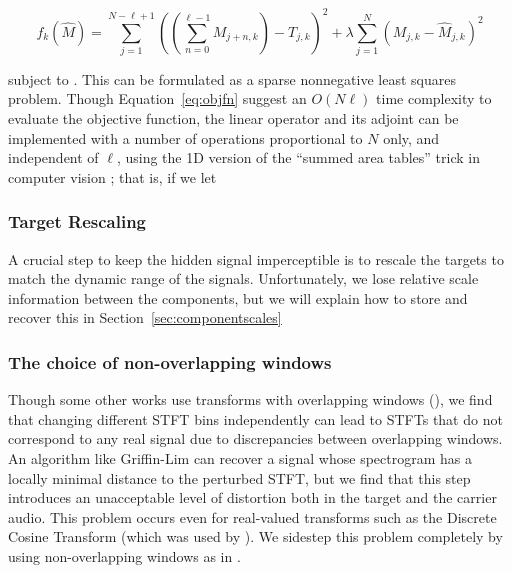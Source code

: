 \documentclass[runningheads]{llncs}
\begin{document}
\begin{equation}
  \label{eq:objfn}
  f_k(\hat{M}) = \sum_{j=1}^{N-\ell+1} \left( \left( \sum_{n = 0}^{\ell-1} M_{j+n, k} \right) - T_{j, k} \right)^2 + \lambda \sum_{j=1}^N \left( M_{j, k} - \hat{M}_{j, k} \right)^2
\end{equation}

subject to .  This can be formulated as a sparse nonnegative least squares problem.  Though Equation~\ref{eq:objfn} suggest an $O(N \ell)$ time complexity to evaluate the objective function, the linear operator and its adjoint can be implemented with a number of operations proportional to $N$ only, and independent of $\ell$, using the 1D version of the ``summed area tables'' trick in computer vision \cite{lewisfast}; that is, if we let 


\subsubsection{Target Rescaling}

A crucial step to keep the hidden signal imperceptible is to rescale the targets to match the dynamic range of the signals.  Unfortunately, we lose relative scale information between the components, but we will explain how to store and recover this in Section~\ref{sec:componentscales}


\subsubsection{The choice of non-overlapping windows}
Though some other works use transforms with overlapping windows (\cite{hwan_sik_yun_acoustic_2010,geleta_pixinwav_2021}), we find that changing different STFT bins independently can lead to STFTs that do not correspond to any real signal due to discrepancies between overlapping windows.  An algorithm like Griffin-Lim \cite{griffin1984signal} can recover a signal whose spectrogram has a locally minimal distance to the perturbed STFT, but we find that this step introduces an unacceptable level of distortion both in the target and the carrier audio.  This problem occurs even for real-valued transforms such as the Discrete Cosine Transform (which was used by \cite{geleta_pixinwav_2021}).  We sidestep this problem completely by using non-overlapping windows as in \cite{xiaoxiao_dong_data_2004}.  
\end{document}
